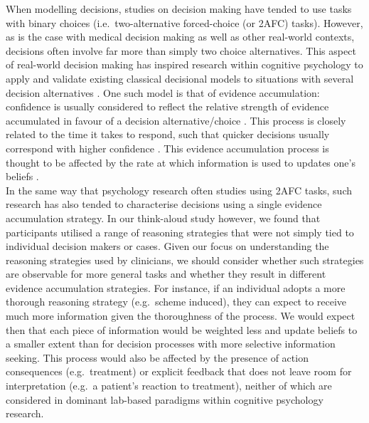 \documentclass[a4paper, nobind]{templates/ociamthesis}
\begin{document}
When modelling decisions, studies on decision making have tended to use tasks with binary choices (i.e.~two-alternative forced-choice (or 2AFC) tasks). However, as is the case with medical decision making as well as other real-world contexts, decisions often involve far more than simply two choice alternatives. This aspect of real-world decision making has inspired research within cognitive psychology to apply and validate existing classical decisional models to situations with several decision alternatives \autocite{churchland2012,tajima2019,busemeyer2019,trueblood2022}. One such model is that of evidence accumulation: confidence is usually considered to reflect the relative strength of evidence accumulated in favour of a decision alternative/choice \autocite{vickers_effects_1982}. This process is closely related to the time it takes to respond, such that quicker decisions usually correspond with higher confidence \autocite{kiani_choice_2014}. This evidence accumulation process is thought to be affected by the rate at which information is used to updates one's beliefs \autocite{kloosterman_humans_2019}.\\

In the same way that psychology research often studies using 2AFC tasks, such research has also tended to characterise decisions using a single evidence accumulation strategy. In our think-aloud study however, we found that participants utilised a range of reasoning strategies that were not simply tied to individual decision makers or cases. Given our focus on understanding the reasoning strategies used by clinicians, we should consider whether such strategies are observable for more general tasks and whether they result in different evidence accumulation strategies. For instance, if an individual adopts a more thorough reasoning strategy (e.g.~scheme induced), they can expect to receive much more information given the thoroughness of the process. We would expect then that each piece of information would be weighted less and update beliefs to a smaller extent than for decision processes with more selective information seeking. This process would also be affected by the presence of action consequences (e.g.~treatment) or explicit feedback that does not leave room for interpretation (e.g.~a patient's reaction to treatment), neither of which are considered in dominant lab-based paradigms within cognitive psychology research.\\
\end{document}
